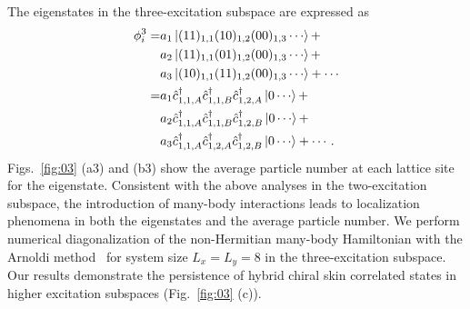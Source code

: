\documentclass[longbibliography, aps, prx, amsmath, amssymb, amsfonts, twocolumn,superscriptaddress, footinbib]{revtex4-1}
\begin{document}
	The eigenstates in the three-excitation subspace are expressed as 
	\begin{equation}
		\begin{split}
			\phi_i^3 =& a_1 \ket{(11)_{1,1}(10)_{1,2}(00)_{1,3}\cdots} +\\
			&a_2 \ket{(11)_{1,1}(01)_{1,2}(00)_{1,3}\cdots} +\\
			&a_3 \ket{(10)_{1,1}(11)_{1,2}(00)_{1,3}\cdots} + \cdots\\
			=& a_1 \hat{c}_{1,1,A}^{\dagger}\hat{c}_{1,1,B}^{\dagger}\hat{c}_{1,2,A}^{\dagger} \ket{0\cdots} +\\
			&a_2 \hat{c}_{1,1,A}^{\dagger}\hat{c}_{1,1,B}^{\dagger}\hat{c}_{1,2,B}^{\dagger} \ket{0\cdots} + \\
			&a_3 \hat{c}_{1,1,A}^{\dagger}\hat{c}_{1,2,A}^{\dagger}\hat{c}_{1,2,B}^{\dagger} \ket{0\cdots} + \cdots.
		\end{split}
	\end{equation}
	Figs.~\ref{fig:03} (a3) and (b3) show the average particle number at each lattice site for the eigenstate. 
	Consistent with the above analyses in the two-excitation subspace, the introduction of many-body interactions leads to localization phenomena in both the eigenstates and the average particle number.
	We perform numerical diagonalization of the non-Hermitian many-body Hamiltonian with the Arnoldi method~\cite{arnoldi1951principle} for system size $L_x = L_y = 8$ in the three-excitation subspace. Our results demonstrate the persistence of hybrid chiral skin correlated states in higher excitation subspaces (Fig.~\ref{fig:03} (c)).
\end{document}
